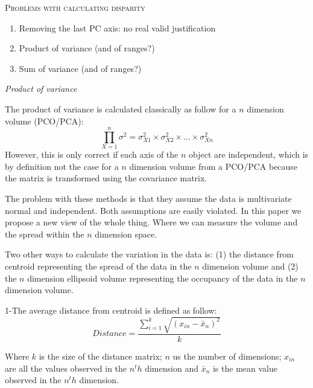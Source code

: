 \documentclass[12pt,letterpaper]{article}
\renewcommand{\section}[1]{%
\bigskip
\begin{center}
\begin{Large}
\normalfont\scshape #1
\medskip
\end{Large}
\end{center}}
\renewcommand{\subsection}[1]{%
\bigskip
\begin{center}
\begin{large}
\normalfont\itshape #1
\end{large}
\end{center}}
\begin{document}
\section{Problems with calculating disparity}

\begin{enumerate}
\item{Removing the last PC axis: no real valid justification}
\item{Product of variance (and of ranges?)}
\item{Sum of variance (and of ranges?)}
\end{enumerate}

\subsection{Product of variance}

The product of variance is calculated classically \cite{Wills1994} as follow for a $n$ dimension volume (PCO/PCA):
\begin{equation}
\prod\limits_{X=1}^n \sigma^2 = \sigma_{X1}^2 \times \sigma_{X2}^2 \times ... \times \sigma_{Xn}^2
\end{equation}
However, this is only correct if each axis of the $n$ object are independent, which is by definition not the case for a $n$ dimension volume from a PCO/PCA because the matrix is transformed using the covariance matrix. %

The problem with these methods is that they assume the data is multivariate normal and independent. Both assumptions are easily violated. In this paper we propose a new view of the whole thing. Where we can measure the volume and the spread within the $n$ dimension space.


Two other ways to calculate the variation in the data is: (1) the distance from centroid \cite{finlay2015morphological} representing the spread of the data in the $n$ dimension volume and (2) the $n$ dimension ellipsoid volume \cite{DonohueDim} representing the occupancy of the data in the $n$ dimension volume.

1-The average distance from centroid is defined as follow:
\begin{equation}
Distance=\frac{{\sum\limits_{i=1}^k \sqrt{(x_{in}-\bar{x}_{n})^2}}}{k}
\end{equation}

Where $k$ is the size of the distance matrix; $n$ us the number of dimensions; $x_{in}$ are all the values observed in the $n^th$ dimension and $\bar{x}_{n}$ is the mean value observed in the $n^th$ dimension.
\end{document}
